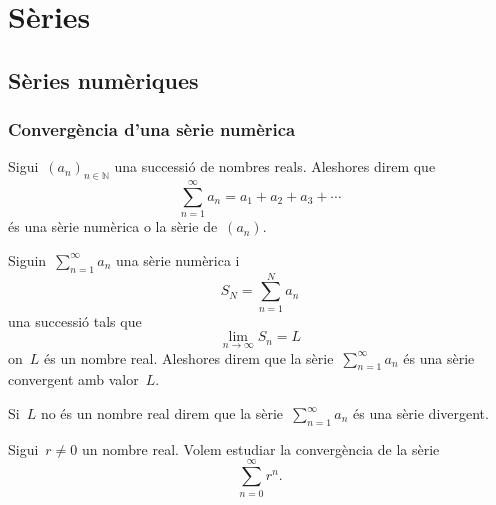 \documentclass[../analisi-matematica.tex]{subfiles}
\begin{document}
\chapter{Sèries}
\section{Sèries numèriques}
    \subsection{Convergència d'una sèrie numèrica}
    \begin{definition}
        \label{def:serie-numerica}
        Sigui~\((a_{n})_{n\in\mathbb{N}}\) una successió de nombres reals.
        Aleshores direm que
        \[
            \sum_{n=1}^{\infty}a_{n}=a_{1}+a_{2}+a_{3}+\cdots
        \]
        és una sèrie numèrica o la sèrie de~\((a_{n})\).
    \end{definition}
    \begin{definition}
        \label{def:serie-convergent}
        \label{def:serie-divergent}
        Siguin~\(\sum_{n=1}^{\infty}a_{n}\) una sèrie numèrica i
        \[
            S_{N}=\sum_{n=1}^{N}a_{n}
        \]
        una successió tals que
        \[
            \lim_{n\to\infty}S_{n}=L
        \]
        on~\(L\) és un nombre real.
        Aleshores direm que la sèrie~\(\sum_{n=1}^{\infty}a_{n}\) és una sèrie convergent amb valor~\(L\).

        Si~\(L\) no és un nombre real direm que la sèrie~\(\sum_{n=1}^{\infty}a_{n}\) és una sèrie divergent.
    \end{definition}
    \begin{example}
        \label{ex:series-geometriques}
        Sigui~\(r\neq0\) un nombre real.
        Volem estudiar la convergència de la sèrie
        \begin{equation}
            \label{ex:series-geometriques:eq1}
            \sum_{n=0}^{\infty}r^{n}.
        \end{equation}
    \end{example}
\end{document}
